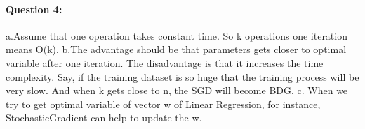 \documentclass[letterpaper,11pt]{article}
\begin{document}
\paragraph{Question 4:}
a.Assume that one operation takes constant time. So k operations one iteration means O(k).
b.The advantage should be that parameters gets closer to optimal variable after one iteration. 
The disadvantage is that it increases the time complexity. Say, if the training dataset is so huge that the training process will be very slow. And when k gets close to n, the SGD will become BDG.
c. When we try to get optimal variable of vector w of Linear Regression, for instance, StochasticGradient can help to update the w.
\end{document}
